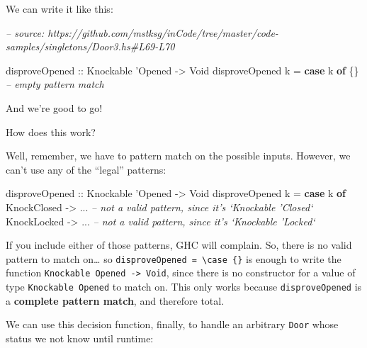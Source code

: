 \documentclass[]{article}
\newenvironment{Shaded}{}{}
\newcommand{\CommentTok}[1]{\textcolor[rgb]{0.38,0.63,0.69}{\textit{#1}}}
\newcommand{\DataTypeTok}[1]{\textcolor[rgb]{0.56,0.13,0.00}{#1}}
\newcommand{\FunctionTok}[1]{\textcolor[rgb]{0.02,0.16,0.49}{#1}}
\newcommand{\KeywordTok}[1]{\textcolor[rgb]{0.00,0.44,0.13}{\textbf{#1}}}
\newcommand{\NormalTok}[1]{#1}
\newcommand{\OtherTok}[1]{\textcolor[rgb]{0.00,0.44,0.13}{#1}}
\begin{document}
We can write it like this:

\begin{Shaded}
\begin{Highlighting}[]
\CommentTok{-- source: https://github.com/mstksg/inCode/tree/master/code-samples/singletons/Door3.hs#L69-L70}

\OtherTok{disproveOpened ::} \DataTypeTok{Knockable}\NormalTok{ '}\DataTypeTok{Opened} \OtherTok{->} \DataTypeTok{Void}
\NormalTok{disproveOpened k }\FunctionTok{=} \KeywordTok{case}\NormalTok{ k }\KeywordTok{of}\NormalTok{ \{\}             }\CommentTok{-- empty pattern match}
\end{Highlighting}
\end{Shaded}

And we're good to go!

How does this work?

Well, remember, we have to pattern match on the possible inputs. However, we
can't use any of the ``legal'' patterns:

\begin{Shaded}
\begin{Highlighting}[]
\OtherTok{disproveOpened ::} \DataTypeTok{Knockable}\NormalTok{ '}\DataTypeTok{Opened} \OtherTok{->} \DataTypeTok{Void}
\NormalTok{disproveOpened k }\FunctionTok{=} \KeywordTok{case}\NormalTok{ k }\KeywordTok{of}
    \DataTypeTok{KnockClosed} \OtherTok{->} \FunctionTok{...}    \CommentTok{-- not a valid pattern, since it's `Knockable 'Closed`}
    \DataTypeTok{KnockLocked} \OtherTok{->} \FunctionTok{...}    \CommentTok{-- not a valid pattern, since it's `Knockable 'Locked`}
\end{Highlighting}
\end{Shaded}

If you include either of those patterns, GHC will complain. So, there is no
valid pattern to match on\ldots{} so
\texttt{disproveOpened\ =\ \textbackslash{}case\ \{\}} is enough to write the
function \texttt{Knockable\ \textquotesingle{}Opened\ -\textgreater{}\ Void},
since there is no constructor for a value of type
\texttt{Knockable\ \textquotesingle{}Opened} to match on. This only works
because \texttt{disproveOpened} is a \textbf{complete pattern match}, and
therefore total.

We can use this decision function, finally, to handle an arbitrary \texttt{Door}
whose status we not know until runtime:
\end{document}
